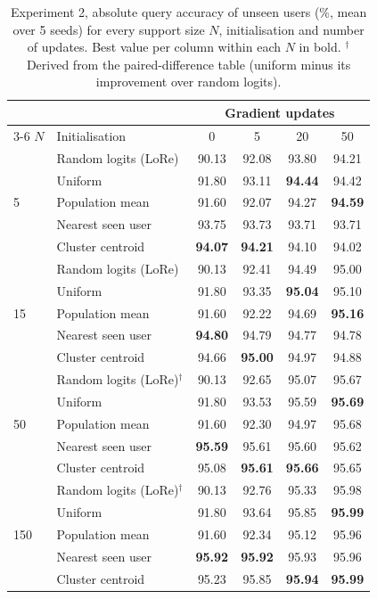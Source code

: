 \documentclass[11pt,a4paper]{article}
\begin{document}
\begin{table}[ht]
\centering\small
\caption{Experiment 2, absolute query accuracy of unseen users (\%, mean over 5 seeds) for every support
size $N$, initialisation and number of updates. Best value per column within each $N$ in bold.
$^\dagger$Derived from the paired-difference table (uniform minus its improvement over random logits).}
\label{tab:init-abs}
\begin{tabular}{@{}ll cccc@{}}
\toprule
& & \multicolumn{4}{c}{Gradient updates}\\
\cmidrule{3-6}
$N$ & Initialisation & 0 & 5 & 20 & 50\\
\midrule
\multirow{5}{*}{5} & Random logits (LoRe) & 90.13 & 92.08 & 93.80 & 94.21\\
 & Uniform & 91.80 & 93.11 & \textbf{94.44} & 94.42\\
 & Population mean & 91.60 & 92.07 & 94.27 & \textbf{94.59}\\
 & Nearest seen user & 93.75 & 93.73 & 93.71 & 93.71\\
 & Cluster centroid & \textbf{94.07} & \textbf{94.21} & 94.10 & 94.02\\
\midrule
\multirow{5}{*}{15} & Random logits (LoRe) & 90.13 & 92.41 & 94.49 & 95.00\\
 & Uniform & 91.80 & 93.35 & \textbf{95.04} & 95.10\\
 & Population mean & 91.60 & 92.22 & 94.69 & \textbf{95.16}\\
 & Nearest seen user & \textbf{94.80} & 94.79 & 94.77 & 94.78\\
 & Cluster centroid & 94.66 & \textbf{95.00} & 94.97 & 94.88\\
\midrule
\multirow{5}{*}{50} & Random logits (LoRe)$^\dagger$ & 90.13 & 92.65 & 95.07 & 95.67\\
 & Uniform & 91.80 & 93.53 & 95.59 & \textbf{95.69}\\
 & Population mean & 91.60 & 92.30 & 94.97 & 95.68\\
 & Nearest seen user & \textbf{95.59} & 95.61 & 95.60 & 95.62\\
 & Cluster centroid & 95.08 & \textbf{95.61} & \textbf{95.66} & 95.65\\
\midrule
\multirow{5}{*}{150} & Random logits (LoRe)$^\dagger$ & 90.13 & 92.76 & 95.33 & 95.98\\
 & Uniform & 91.80 & 93.64 & 95.85 & \textbf{95.99}\\
 & Population mean & 91.60 & 92.34 & 95.12 & 95.96\\
 & Nearest seen user & \textbf{95.92} & \textbf{95.92} & 95.93 & 95.96\\
 & Cluster centroid & 95.23 & 95.85 & \textbf{95.94} & \textbf{95.99}\\
\bottomrule
\end{tabular}
\end{table}
\end{document}

